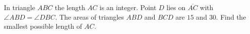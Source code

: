 In triangle $ABC$ the length $AC$ is an integer. Point $D$ lies on $\overline{AC}$ with $\angle ABD=\angle DBC$. The areas of triangles $ABD$ and $BCD$ are $15$ and $30$. Find the smallest possible length of $AC$.
